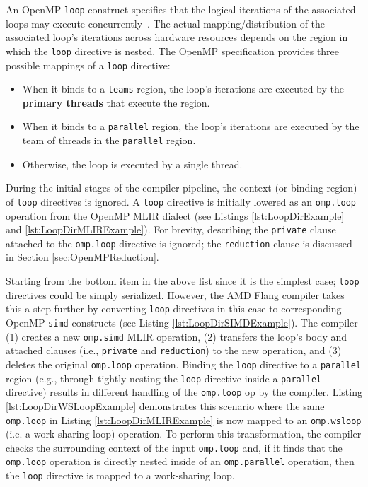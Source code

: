 \documentclass[acmtog,natbib=false]{acmart}
\newcommand{\code}[1]{\texttt{#1}\xspace}
\begin{document}
An OpenMP \code{loop} construct specifies that the logical iterations of the associated loops may execute concurrently~\cite{OARB21}.
The actual mapping/distribution of the associated loop's iterations across hardware resources depends on the region in which the \code{loop} directive is nested.
The OpenMP specification provides three possible mappings of a \code{loop} directive:
\begin{itemize}
    \item When it binds to a \code{teams} region, the loop's iterations are executed by the \textbf{primary threads} that execute the region.
    \item When it binds to a \code{parallel} region, the loop's iterations are executed by the team of threads in the \code{parallel} region.
    \item Otherwise, the loop is executed by a single thread.
\end{itemize}
During the initial stages of the compiler pipeline, the context (or binding region) of \code{loop} directives is ignored.
A \code{loop} directive is initially lowered as an \code{omp.loop} operation from the OpenMP \ac{MLIR} dialect (see Listings \ref{lst:LoopDirExample} and \ref{lst:LoopDirMLIRExample}).
For brevity, describing the \code{private} clause attached to the \code{omp.loop} directive is ignored; the \code{reduction} clause is discussed in Section \ref{sec:OpenMPReduction}.

Starting from the bottom item in the above list since it is the simplest case; \code{loop} directives could be simply serialized.
However, the AMD Flang compiler takes this a step further by converting \code{loop} directives in this case to corresponding OpenMP \code{simd} constructs (see Listing \ref{lst:LoopDirSIMDExample}).
The compiler (1) creates a new \code{omp.simd} \ac{MLIR} operation, (2) transfers the loop's body and attached clauses (i.e., \code{private} and \code{reduction}) to the new operation, and (3) deletes the original \code{omp.loop} operation.
Binding the \code{loop} directive to a \code{parallel} region (e.g., through tightly nesting the \code{loop} directive inside a \code{parallel} directive) results in different handling of the \code{omp.loop} op by the compiler.
Listing \ref{lst:LoopDirWSLoopExample} demonstrates this scenario where the same \code{omp.loop} in Listing \ref{lst:LoopDirMLIRExample} is now mapped to an \code{omp.wsloop} (i.e. a work-sharing loop) operation.
To perform this transformation, the compiler checks the surrounding context of the input \code{omp.loop} and, if it finds that the \code{omp.loop} operation is directly nested inside of an \code{omp.parallel} operation, then the \code{loop} directive is mapped to a work-sharing loop.
\end{document}
